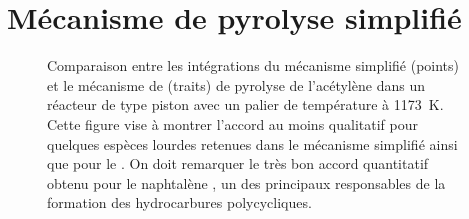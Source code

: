 \chapter{Mécanisme de pyrolyse simplifié}
\label{an:simplification-norinaga}

\begin{figure}[!h]
  \centering{}

  \caption{\label{norinaga-comparison-simplification-1173K-hap}Comparaison entre les intégrations du mécanisme simplifié (points) et le mécanisme de \citet{Norinaga2009} (traits) de pyrolyse de l'acétylène dans un réacteur de type piston avec un palier de température à \SI{1173}{\kelvin}. Cette figure vise à montrer l'accord au moins qualitatif pour quelques espèces lourdes retenues dans le mécanisme simplifié ainsi que pour le . On doit remarquer le très bon accord quantitatif obtenu pour le naphtalène , un des principaux responsables de la formation des hydrocarbures polycycliques.}
\end{figure}

